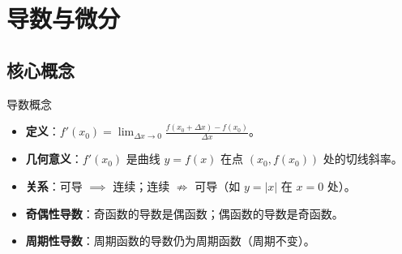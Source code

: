 \documentclass[UTF8, a4paper, 10pt]{ctexart} %
\begin{document}
\section{导数与微分}

\subsection{核心概念}
\begin{concept}{导数概念}
    \begin{itemize}[nosep]
        \item \textbf{定义}：$f'(x_0) = \lim_{\Delta x \to 0} \frac{f(x_0 + \Delta x) - f(x_0)}{\Delta x}$。
        \item \textbf{几何意义}：$f'(x_0)$ 是曲线 $y=f(x)$ 在点 $(x_0, f(x_0))$ 处的切线斜率。
        \item \textbf{关系}：可导 $\implies$ 连续；连续 $\nRightarrow$ 可导（如 $y=|x|$ 在 $x=0$ 处）。
        \item \textbf{奇偶性导数}：奇函数的导数是偶函数；偶函数的导数是奇函数。
        \item \textbf{周期性导数}：周期函数的导数仍为周期函数（周期不变）。
    \end{itemize}
\end{concept}
\end{document}
